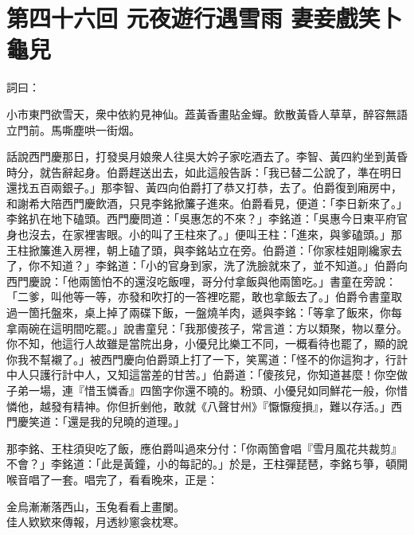 
\chapter*{第四十六回 元夜遊行遇雪雨 妻妾戲笑卜龜兒}


詞曰：

\begin{myquote}
小市東門欲雪天，衆中依約見神仙。蕋黃香畫貼金蟬。飲散黃昏人草草，醉容無語立門前。馬嘶塵哄一街烟。

\end{myquote}

話說西門慶那日，打發吳月娘衆人往吳大妗子家吃酒去了。李智、黃四約坐到黃昏時分，就告辭起身。伯爵趕送出去，如此這般告訴：「我已替二公說了，準在明日還找五百兩銀子。」那李智、黃四向伯爵打了恭又打恭，去了。伯爵復到廂房中，和謝希大陪西門慶飲酒，只見李銘掀簾子進來。伯爵看見，便道：「李日新來了。」李銘扒在地下磕頭。西門慶問道：「吳惠怎的不來？」李銘道：「吳惠今日東平府官身也沒去，在家裡害眼。小的叫了王柱來了。」便叫王柱：「進來，與爹磕頭。」那王柱掀簾進入房裡，朝上磕了頭，與李銘站立在旁。伯爵道：「你家桂姐剛纔家去了，你不知道？」李銘道：「小的官身到家，洗了洗臉就來了，並不知道。」伯爵向西門慶說：「他兩箇怕不的還沒吃飯哩，哥分付拿飯與他兩箇吃。」書童在旁說：「二爹，叫他等一等，亦發和吹打的一答裡吃罷，敢也拿飯去了。」伯爵令書童取過一箇托盤來，桌上掉了兩碟下飯，一盤燒羊肉，遞與李銘：「等拿了飯來，你每拿兩碗在這明間吃罷。」說書童兒：「我那傻孩子，常言道：方以類聚，物以羣分。你不知，他這行人故雖是當院出身，小優兒比樂工不同，一概看待也罷了，顯的說你我不幫襯了。」被西門慶向伯爵頭上打了一下，笑罵道：「怪不的你這狗才，行計中人只護行計中人，又知這當差的甘苦。」伯爵道：「傻孩兒，你知道甚麼！你空做子弟一場，連『惜玉憐香』四箇字你還不曉的。粉頭、小優兒如同鮮花一般，你惜憐他，越發有精神。你但折剉他，敢就《八聲甘州》『懨懨瘦損』，難以存活。」西門慶笑道：「還是我的兒曉的道理。」

那李銘、王柱須臾吃了飯，應伯爵叫過來分付：「你兩箇會唱『雪月風花共裁剪』不會？」李銘道：「此是黃鐘，小的每記的。」於是，王柱彈琵琶，李銘ち箏，頓開喉音唱了一套。唱完了，看看晚來，正是：

\begin{myquote}
金烏漸漸落西山，玉兔看看上畫闌。\\佳人欵欵來傳報，月透紗窻衾枕寒。
\end{myquote}

